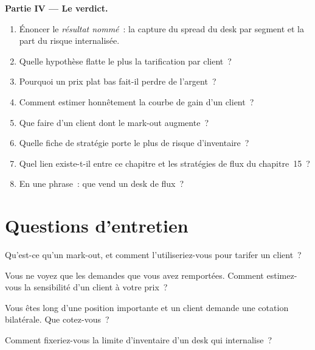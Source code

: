 \begin{problem}
\medskip\noindent\textbf{Partie IV --- Le verdict.}
\begin{enumerate}[resume]
\item Énoncer le \emph{résultat nommé}~: la capture du spread du desk par segment et la part du risque internalisée.
\item Quelle hypothèse flatte le plus la tarification par client~?
\item Pourquoi un prix plat bas fait-il perdre de l'argent~?
\item Comment estimer honnêtement la courbe de gain d'un client~?
\item Que faire d'un client dont le mark-out augmente~?
\item Quelle fiche de stratégie porte le plus de risque d'inventaire~?
\item Quel lien existe-t-il entre ce chapitre et les stratégies de flux du chapitre~15~?
\item En une phrase~: que vend un desk de flux~?
\end{enumerate}
\end{problem}

\section{Questions d'entretien}

\begin{interviewq}\label{iq:s2:flow-market-making-at-a-bank:1}
Qu'est-ce qu'un mark-out, et comment l'utiliseriez-vous pour tarifer un client~?
\end{interviewq}

\begin{interviewq}\label{iq:s2:flow-market-making-at-a-bank:2}
Vous ne voyez que les demandes que vous avez remportées. Comment estimez-vous la sensibilité d'un client à votre prix~?
\end{interviewq}

\begin{interviewq}\label{iq:s2:flow-market-making-at-a-bank:3}
Vous êtes long d'une position importante et un client demande une cotation bilatérale. Que cotez-vous~?
\end{interviewq}

\begin{interviewq}\label{iq:s2:flow-market-making-at-a-bank:4}
Comment fixeriez-vous la limite d'inventaire d'un desk qui internalise~?
\end{interviewq}

